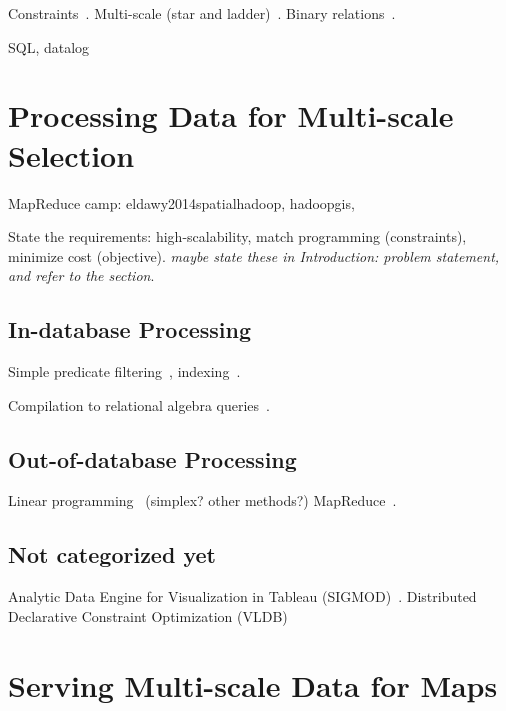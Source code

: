\documentclass[11pt, oneside]{report}
\begin{document}
Constraints~\cite{harrie1999constraint, woodruff1998constant, topfer1966principles, sarma2012fusiontables, nutanong2012multiresolution}.
Multi-scale (star and ladder)~\cite{foerster2010challenges, sarma2012fusiontables}.
Binary relations~\cite{egenhofer1991categorizing, randell1992spatial}. 

SQL, datalog


\section{Processing Data for Multi-scale Selection}
\label{related:work:processing}

MapReduce camp: eldawy2014spatialhadoop, hadoopgis, 

State the requirements: high-scalability, match programming (constraints), minimize cost (objective).
\emph{maybe state these in Introduction: problem statement, and refer to the section}.

\subsection{In-database Processing}

Simple predicate filtering~\cite{vizzuality2012cartodb}, indexing~\cite{nutanong2012multiresolution, van1995gap}.

Compilation to relational algebra queries~\cite{wu2014case, battle2013scalar, boncz2006monetdb, grust2009ferry}.

\subsection{Out-of-database Processing}

Linear programming~\cite{haunert2006landcover, sarma2012fusiontables} (simplex? other methods?)
MapReduce~\cite{aji2013hadoopgis}.

\subsection{Not categorized yet}

Analytic Data Engine for Visualization in Tableau (SIGMOD)~\cite{wesley2011tableau}.
Distributed Declarative Constraint Optimization (VLDB)~\cite{liu2012cologne}




\section{Serving Multi-scale Data for Maps}
\label{related:work:serving}
\end{document}
